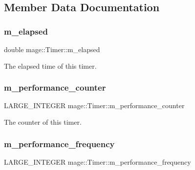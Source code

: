 \subsection{Member Data Documentation}
\hypertarget{classmage_1_1_timer_aa2c50b9ffa85600791a21e2db4c43e91}{}\label{classmage_1_1_timer_aa2c50b9ffa85600791a21e2db4c43e91} 
\subsubsection{\texorpdfstring{m\+\_\+elapsed}{m\_elapsed}}
{\footnotesize\ttfamily double mage\+::\+Timer\+::m\+\_\+elapsed\hspace{0.3cm}{\ttfamily [private]}}

The elapsed time of this timer. \hypertarget{classmage_1_1_timer_a70bdbf53f8cd69a46db8b75e08d3ead8}{}\label{classmage_1_1_timer_a70bdbf53f8cd69a46db8b75e08d3ead8} 
\subsubsection{\texorpdfstring{m\+\_\+performance\+\_\+counter}{m\_performance\_counter}}
{\footnotesize\ttfamily L\+A\+R\+G\+E\+\_\+\+I\+N\+T\+E\+G\+ER mage\+::\+Timer\+::m\+\_\+performance\+\_\+counter\hspace{0.3cm}{\ttfamily [private]}}

The counter of this timer. \hypertarget{classmage_1_1_timer_a1618c4901b6f898165a2d79d02a2518e}{}\label{classmage_1_1_timer_a1618c4901b6f898165a2d79d02a2518e} 
\subsubsection{\texorpdfstring{m\+\_\+performance\+\_\+frequency}{m\_performance\_frequency}}
{\footnotesize\ttfamily L\+A\+R\+G\+E\+\_\+\+I\+N\+T\+E\+G\+ER mage\+::\+Timer\+::m\+\_\+performance\+\_\+frequency\hspace{0.3cm}{\ttfamily [private]}}

